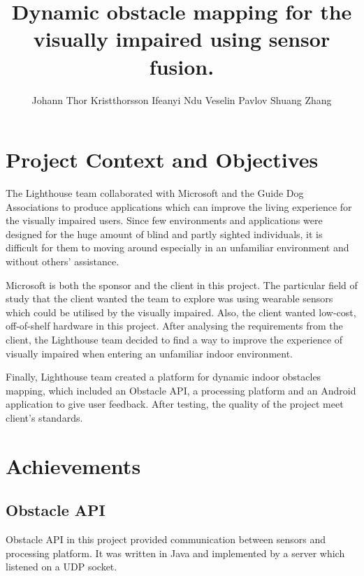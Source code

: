 \documentclass[prodmode,acmtosem]{acmsmall} %
\begin{document}

\title{Dynamic obstacle mapping for the visually impaired using sensor fusion.}
\author{Johann Thor Kristthorsson
Ifeanyi Ndu
Veselin Pavlov
Shuang Zhang
}

\maketitle

\section{Project Context and Objectives}
The Lighthouse team collaborated with Microsoft and the Guide Dog Associations to produce applications which can improve the living experience for the visually impaired users. Since few environments and applications were designed for the huge amount of blind and partly sighted individuals, it is difficult for them to moving around especially in an unfamiliar environment and without others’ assistance. 

Microsoft is both the sponsor and the client in this project. The particular field of study that the client wanted the team to explore was using wearable sensors which could be utilised by the visually impaired. Also, the client wanted low-cost, off-of-shelf hardware in this project. After analysing the requirements from the client, the Lighthouse team decided to find a way to improve the experience of visually impaired when entering an unfamiliar indoor environment.

Finally, Lighthouse team created a platform for dynamic indoor obstacles mapping, which included an Obstacle API, a processing platform and an Android application to give user feedback. After testing, the quality of the project meet client's standards.

\section{Achievements}
\subsection{Obstacle API}
Obstacle API in this project provided communication between sensors and processing platform. It was written in Java and implemented by a server which listened on a UDP socket.
\end{document}
